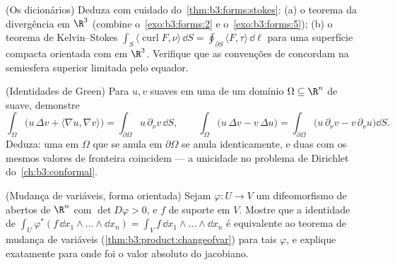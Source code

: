 \begin{exercise}[$\star\star$]\label{exo:b3:forms:7}
(Os dicionários) Deduza com cuidado do~\cref{thm:b3:forms:stokes}: (a) o teorema da
divergência em $\R^3$ (combine o~\cref{exo:b3:forms:2} e o~\cref{exo:b3:forms:5});
(b) o teorema de Kelvin--Stokes $\int_S\langle\operatorname{curl}F, \nu\rangle\,\dd S =
\oint_{\partial S}\langle F, \tau\rangle\,\dd\ell$ para uma superfície compacta
orientada com  em $\R^3$. Verifique que as convenções de
 concordam na semiesfera superior limitada pelo equador.
\end{exercise}

\begin{exercise}[$\star\star$]\label{exo:b3:forms:8}
(Identidades de Green) Para $u, v$ suaves em uma  de um
domínio  $\Omega \subseteq \R^n$ de  suave, demonstre
\[
\int_\Omega\bigl(u\,\Delta v + \langle\nabla u, \nabla
v\rangle\bigr) = \int_{\partial\Omega}u\,\partial_\nu
v\,\dd S,
\qquad
\int_\Omega\bigl(u\,\Delta v - v\,\Delta u\bigr) =
\int_{\partial\Omega}\bigl(u\,\partial_\nu v -
v\,\partial_\nu u\bigr)\dd S .
\]
Deduza: uma  em $\Omega$ que se anula em $\partial\Omega$ se
anula identicamente, e duas  com os mesmos valores de
fronteira coincidem --- a unicidade no problema de Dirichlet do~\cref{ch:b3:conformal}.
\end{exercise}

\begin{exercise}[$\star\star$]\label{exo:b3:forms:9}
(Mudança de variáveis, forma orientada) Sejam $\varphi\colon U
\to V$ um difeomorfismo de
abertos de $\R^n$ com $\det
D\varphi > 0$, e $f$  de suporte 
em $V$. Mostre que a identidade de  $\int_U\varphi^*(f\,\dd x_1\wedge\dots\wedge\dd x_n) =
\int_Vf\,\dd x_1\wedge\dots\wedge\dd x_n$ é equivalente ao
teorema de mudança de variáveis (\cref{thm:b3:product:changeofvar}) para tais $\varphi$, e
explique exatamente para onde foi o valor absoluto do jacobiano.
\end{exercise}

